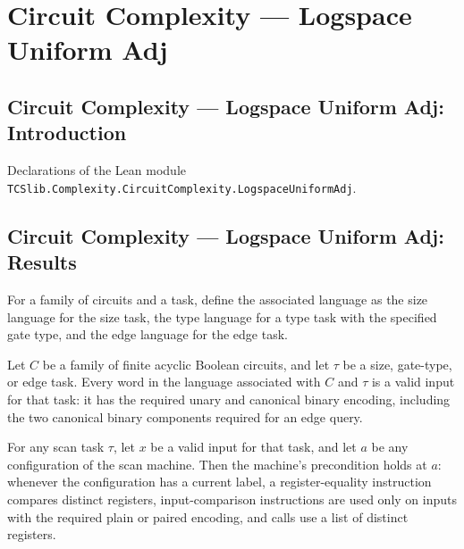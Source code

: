 \section{Circuit Complexity --- Logspace Uniform Adj}
\subsection*{Circuit Complexity --- Logspace Uniform Adj: Introduction}

Declarations of the Lean module \texttt{TCSlib.Complexity.CircuitComplexity.LogspaceUniformAdj}.

\subsection*{Circuit Complexity --- Logspace Uniform Adj: Results}

\begin{definition}
\label{BoolCircuit.AdjScan.lang}
\leanok
{}
For a family of circuits and a task, define the associated language as the size language
for the size task, the type language for a type task with the specified gate type, and
the edge language for the edge task.
\end{definition}

\begin{lemma}
\label{BoolCircuit.AdjScan.valid_of_mem}
\leanok
{}
Let $C$ be a family of finite acyclic Boolean circuits, and let $\tau$ be a size,
gate-type, or edge task. Every word in the language associated with $C$ and $\tau$ is a
valid input for that task: it has the required unary and canonical binary encoding,
including the two canonical binary components required for an edge query.
\end{lemma}

\begin{lemma}
\label{BoolCircuit.AdjScan.preS_scan}
\leanok
{}
For any scan task $\tau$, let $x$ be a valid input for that task, and let $a$ be any
configuration of the scan machine. Then the machine's precondition holds at $a$:
whenever the configuration has a current label, a register-equality instruction compares
distinct registers, input-comparison instructions are used only on inputs with the
required plain or paired encoding, and calls use a list of distinct registers.
\end{lemma}

